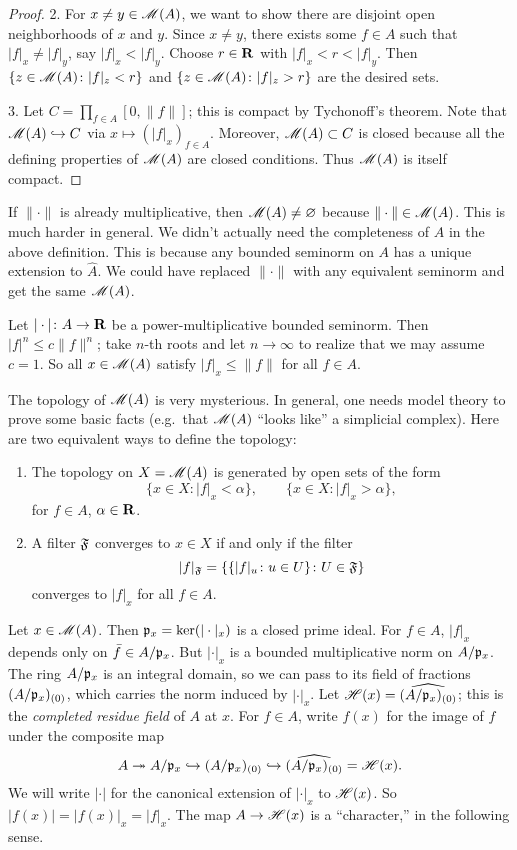 \begin{proof}
2. For $x\ne y\in \operatorname{\mathscr{M}}(A)$, we want to show there are disjoint open 
neighborhoods of $x$ and $y$. Since $x\ne y$, there exists some $f\in A$ such 
that $|f|_x\ne |f|_y$, say $|f|_x<|f|_y$. Choose $r\in \mathbf{R}$ with 
$|f|_x<r<|f|_y$. Then $\{z\in \operatorname{\mathscr{M}}(A)\colon |f|_z<r\}$ and 
$\{z\in \operatorname{\mathscr{M}}(A)\colon |f|_z>r\}$ are the desired sets. 

3. Let $C=\prod_{f\in A} [0,\|f\|]$; this is compact by Tychonoff's theorem. 
Note that $\operatorname{\mathscr{M}}(A)\hookrightarrow C$ via $x\mapsto (|f|_x)_{f\in A}$. 
Moreover, $\operatorname{\mathscr{M}}(A)\subset C$ is closed because all the defining properties 
of $\operatorname{\mathscr{M}}(A)$ are closed conditions. Thus $\operatorname{\mathscr{M}}(A)$ is itself 
compact. 
\end{proof}

If $\|\cdot\|$ is already multiplicative, then $\operatorname{\mathscr{M}}(A)\ne\varnothing$ 
because $\|\cdot\|\in \operatorname{\mathscr{M}}(A)$. This is much harder in general. We didn't 
actually need the completeness of $A$ in the above definition. This is because 
any bounded seminorm on $A$ has a unique extension to $\widehat A$. We could 
have replaced $\|\cdot\|$ with any equivalent seminorm and get the same 
$\operatorname{\mathscr{M}}(A)$. 

Let $|\cdot|\colon A\to \mathbf{R}$ be a power-multiplicative bounded seminorm. Then 
$|f|^n \leqslant c\|f\|^n$; take $n$-th roots and let $n\to \infty$ to realize 
that we may assume $c=1$. So all $x\in \operatorname{\mathscr{M}}(A)$ satisfy 
$|f|_x\leqslant \|f\|$ for all $f\in A$. 

The topology of $\operatorname{\mathscr{M}}(A)$ is very mysterious. In general, one needs model 
theory to prove some basic facts (e.g.~that $\operatorname{\mathscr{M}}(A)$ ``looks like'' a 
simplicial complex). Here are two equivalent ways to define the topology:
\begin{enumerate}
\item
The topology on $X=\operatorname{\mathscr{M}}(A)$ is generated by open sets of the form 
\[
  \{x\in X\colon |f|_x<\alpha\} , \qquad \{x\in X\colon |f|_x>\alpha\} ,
\]
for $f\in A$, $\alpha\in \mathbf{R}$. 

\item
A filter $\mathfrak{F}$ converges to $x\in X$ if and only if the filter 
\[
  |f|_{\mathfrak{F}} = \left\{\{|f|_u\colon u\in U\}\colon U\in \mathfrak{F}\right\} 
\]
converges to $|f|_x$ for all $f\in A$.  
\end{enumerate}

Let $x\in \operatorname{\mathscr{M}}(A)$. Then $\mathfrak{p}_x = \ker(|\cdot|_x)$ is a closed prime 
ideal. For $f\in A$, $|f|_x$ depends only on $\bar f\in A/\mathfrak{p}_x$. But 
$|\cdot|_x$ is a bounded multiplicative norm on $A/\mathfrak{p}_x$. The ring $A/\mathfrak{p}_x$ 
is an integral domain, so we can pass to its field of fractions 
$(A/\mathfrak{p}_x)_{(0)}$, which carries the norm induced by $|\cdot|_x$. Let 
$\mathscr{H}(x) = \widehat{(A/\mathfrak{p}_x)_{(0)}}$; this is the \emph{completed residue 
field} of $A$ at $x$. For $f\in A$, write $f(x)$ for the image of $f$ under the 
composite map 
\[
  A \twoheadrightarrow A/\mathfrak{p}_x \hookrightarrow (A/\mathfrak{p}_x)_{(0)} \hookrightarrow \widehat{(A/\mathfrak{p}_x)_{(0)}} = \mathscr{H}(x) .
\]
We will write $|\cdot|$ for the canonical extension of $|\cdot|_x$ to 
$\mathscr{H}(x)$. So $|f(x)| = |f(x)|_x = |f|_x$. The map $A\to \mathscr{H}(x)$ is a 
``character,'' in the following sense. 

